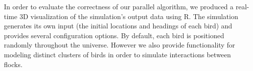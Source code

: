 In order to evaluate the correctness of our parallel algorithm, we
produced a real-time 3D visualization of the simulation's output data
using R. The simulation generates its own input (the initial locations
and headings of each bird) and provides several configuration
options. By default, each bird is positioned randomly throughout the
universe. However we also provide functionality for modeling distinct
clusters of birds in order to simulate interactions between flocks.
